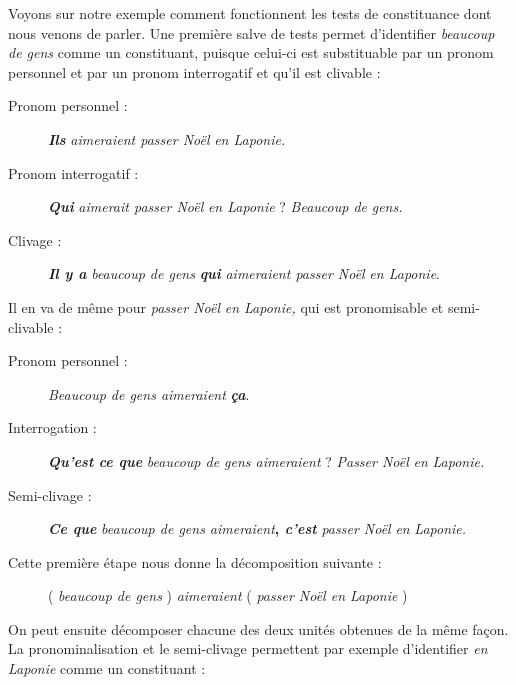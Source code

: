 Voyons sur notre exemple comment fonctionnent les tests de constituance dont nous venons de parler. Une première salve de tests permet d’identifier \textit{beaucoup de gens} comme un constituant, puisque celui-ci est substituable par un pronom personnel et par un pronom interrogatif et qu’il est clivable :
\begin{description}
\item[Pronom personnel :] \textbf{\textit{Ils}} \textit{aimeraient passer Noël} \textit{en Laponie.}
\item[Pronom interrogatif :] \textbf{\textit{Qui}} \textit{aimerait passer Noël} \textit{en Laponie} ? \textit{Beaucoup de}                   \textit{gens.}
\item[Clivage :] \textbf{\textit{Il y a}} \textit{beaucoup de gens} \textbf{\textit{qui}} \textit{aimeraient passer Noël} \textit{en Laponie}.
\end{description}

Il en va de même pour \textit{passer Noël} \textit{en Laponie,} qui est pronomisable et semi-clivable :

\begin{description}
  \item[Pronom personnel :] \textit{Beaucoup de gens aimeraient} \textbf{\textit{ça}}.
  \item[Interrogation :] \textbf{\textit{Qu’est} \textit{ce que}} \textit{beaucoup de gens aimeraient} ? \textit{Passer Noël} \textit{en}               \textit{Laponie.}
  \item[Semi-clivage :] \textbf{\textit{Ce que}} \textit{beaucoup de gens aimeraient}\textbf{, \textit{c’est}} \textit{passer Noël} \textit{en}                  \textit{Laponie.}
\end{description}

Cette première étape nous donne la décomposition suivante :

\begin{figure}
   ( \textit{beaucoup de gens} ) \textit{aimeraient} ( \textit{passer Noël en Laponie} )
   \caption{\label{fig:}}
   \end{figure}

On peut ensuite décomposer chacune des deux unités obtenues de la même façon. La pronominalisation et le semi-clivage permettent par exemple d’identifier \textit{en Laponie} comme un constituant :

